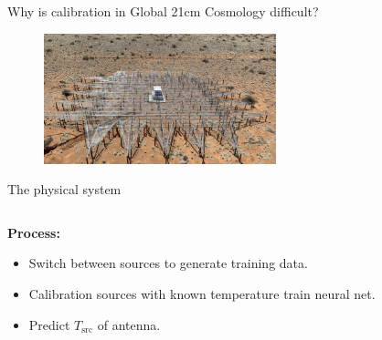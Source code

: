 \documentclass[aspectratio=169]{beamer}
\begin{document}
\begin{frame}{\small{Why is calibration in Global 21cm Cosmology difficult?}}
	\begin{figure}[h]
		\centering
		\includegraphics[width=0.6\textwidth]{images/antenna.png}
	\end{figure}

	\begin{center}
	\end{center}

\end{frame}

\begin{frame}{\small{The physical system}}
	\begin{columns}
		\begin{column}{0.3\textwidth}
			\textbf{Process:}
			\begin{itemize}
				\item Switch between sources to generate training data.
				\item Calibration sources with known temperature train neural net.
				\item Predict $T_{\text{src}}$ of antenna.
			\end{itemize}
		\end{column}

		\begin{column}{0.7\textwidth}
			\begin{figure}
				\centering
				
			\end{figure}
		\end{column}
	\end{columns}
	\vfill
\end{frame}
\end{document}
